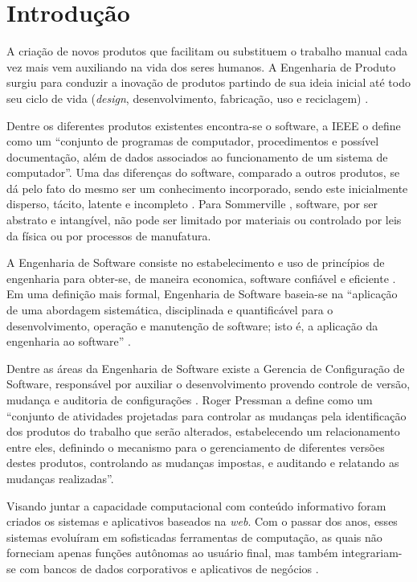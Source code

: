 \chapter{Introdução}
A criação de novos produtos que facilitam ou substituem o trabalho manual cada vez mais vem auxiliando na vida dos seres humanos. A Engenharia de Produto surgiu para conduzir a inovação de produtos partindo de sua ideia inicial até todo seu ciclo de vida (\textit{design}, desenvolvimento, fabricação, uso e reciclagem) \cite{ortloff2014}.

Dentre os diferentes produtos existentes encontra-se o software, a IEEE \cite{ieee_glossary} o define como um ``conjunto de programas de computador, procedimentos e possível documentação, além de dados associados ao funcionamento de um sistema de computador''. Uma das diferenças do software, comparado a outros produtos, se dá pelo fato do mesmo ser um conhecimento incorporado, sendo este inicialmente disperso, tácito, latente e incompleto \cite{baetjer1997}. Para Sommerville \cite{sommerville_2006}, software, por ser abstrato e intangível, não pode ser limitado por materiais ou controlado por leis da física ou por processos de manufatura.

A Engenharia de Software consiste no estabelecimento e uso de princípios de engenharia para obter-se, de maneira economica, software confiável e eficiente \cite{naur_1969}. Em uma definição mais formal, Engenharia de Software baseia-se na ``aplicação de uma abordagem sistemática, disciplinada e quantificável para o desenvolvimento, operação e manutenção de software; isto é, a aplicação da engenharia ao software'' \cite{ieee_glossary}.

Dentre as áreas da Engenharia de Software existe a Gerencia de Configuração de Software, responsável por auxiliar o desenvolvimento provendo controle de versão, mudança e auditoria de configurações \cite{SWEBOK2014}. Roger Pressman \cite{pressman_2009} a define como um ``conjunto de atividades projetadas para controlar as mudanças pela identificação dos produtos do trabalho que serão alterados, estabelecendo um relacionamento entre eles, definindo o mecanismo para o gerenciamento de diferentes versões destes produtos, controlando as mudanças impostas, e auditando e relatando as mudanças realizadas''.

Visando juntar a capacidade computacional com conteúdo informativo foram criados os sistemas e aplicativos baseados na \textit{web}. Com o passar dos anos, esses sistemas evoluíram em sofisticadas ferramentas de computação, as quais não forneciam apenas funções autônomas ao usuário final, mas também integrariam-se com bancos de dados corporativos e aplicativos de negócios \cite{pressman_2009}.

